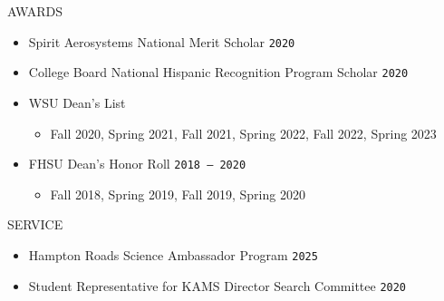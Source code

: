 \documentclass[10pt,a4paper]{article}
\def\bline{\vspace*{0.2cm}}
\newcommand\datetf[2]{\texttt{#1\,--\,#2}}
\newcommand\datei[1]{\texttt{#1}}
\newenvironment{cvsection}[1]
{
{\LARGE #1} \hrulefill
\vspace*{3ex}
}
{
\vspace*{3ex}
}
\begin{document}
\begin{cvsection}{AWARDS}
\begin{itemize}[nosep,leftmargin=*,label=$\circ$]
\item Spirit Aerosystems National Merit Scholar \hfill \datei{2020} %
\item College Board National Hispanic Recognition Program Scholar \hfill \datei{2020} %
\item WSU Dean's List
\begin{itemize}[nosep,leftmargin=*,label=$-$]
    \item Fall 2020, Spring 2021, Fall 2021, Spring 2022, Fall 2022, Spring 2023
\end{itemize}
\item FHSU Dean's Honor Roll \hfill \datetf{2018}{2020}
\begin{itemize}[nosep,leftmargin=*,label=$-$]
    \item Fall 2018, Spring 2019, Fall 2019, Spring 2020
\end{itemize}

\end{itemize}

\end{cvsection}


\begin{cvsection}{SERVICE}

\begin{itemize}[nosep,leftmargin=*,label=$\circ$]

    \item Hampton Roads Science Ambassador Program \hfill \datei{2025}

    \item Student Representative for KAMS Director Search Committee \hfill \datei{2020}


\end{itemize}

\end{cvsection}


\end{document}
